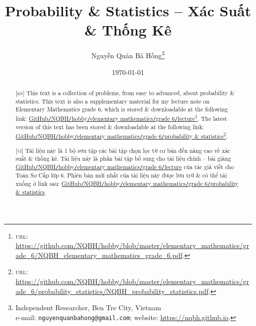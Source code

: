 \documentclass{article}
\title{Probability \& Statistics -- Xác Suất \& Thống Kê}
\author{Nguyễn Quản Bá Hồng\footnote{Independent Researcher, Ben Tre City, Vietnam\\e-mail: \texttt{nguyenquanbahong@gmail.com}; website: \url{https://nqbh.github.io}.}}
\date{\today}
\numberwithin{equation}{section}
\begin{document}
\maketitle
\begin{abstract}
	\textsc{[en]} This text is a collection of problems, from easy to advanced, about probability \& statistics. This text is also a supplementary material for my lecture note on Elementary Mathematics grade 6, which is stored \& downloadable at the following link: \href{https://github.com/NQBH/hobby/blob/master/elementary_mathematics/grade_6/NQBH_elementary_mathematics_grade_6.pdf}{GitHub\texttt{/}NQBH\texttt{/}hobby\texttt{/}elementary mathematics\texttt{/}grade 6\texttt{/}lecture}\footnote{\textsc{url}: \url{https://github.com/NQBH/hobby/blob/master/elementary_mathematics/grade_6/NQBH_elementary_mathematics_grade_6.pdf}.}. The latest version of this text has been stored \& downloadable at the following link: \href{https://github.com/NQBH/hobby/blob/master/elementary_mathematics/grade_6/integer/NQBH_integer.pdf}{GitHub\texttt{/}NQBH\texttt{/}hobby\texttt{/}elementary mathematics\texttt{/}grade 6\texttt{/}probability \& statistics}\footnote{\textsc{url}: \url{https://github.com/NQBH/hobby/blob/master/elementary_mathematics/grade_6/probability_statistics/NQBH_probability_statistics.pdf}.}.
	\vspace{2mm}
	
	\textsc{[vi]} Tài liệu này là 1 bộ sưu tập các bài tập chọn lọc từ cơ bản đến nâng cao về xác suất \& thống kê. Tài liệu này là phần bài tập bổ sung cho tài liệu chính -- bài giảng \href{https://github.com/NQBH/hobby/blob/master/elementary_mathematics/grade_6/NQBH_elementary_mathematics_grade_6.pdf}{GitHub\texttt{/}NQBH\texttt{/}hobby\texttt{/}elementary mathematics\texttt{/}grade 6\texttt{/}lecture} của tác giả viết cho Toán Sơ Cấp lớp 6. Phiên bản mới nhất của tài liệu này được lưu trữ \& có thể tải xuống ở link sau: \href{https://github.com/NQBH/hobby/blob/master/elementary_mathematics/grade_6/probability_statistics/NQBH_probability_statistics.pdf}{GitHub\texttt{/}NQBH\texttt{/}hobby\texttt{/}elementary mathematics\texttt{/}grade 6\texttt{/}probability \& statistics}.
\end{abstract}
\tableofcontents
\newpage

\end{document}
